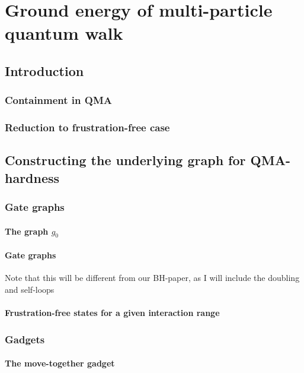 \documentclass[../thesis-main/thesis-main]{subfiles}
\begin{document}
\chapter{Ground energy of multi-particle quantum walk}

\section{Introduction}
\subsection{Containment in QMA}
\subsection{Reduction to frustration-free case}


\section{Constructing the underlying graph for QMA-hardness}

\subsection{Gate graphs}
\subsubsection{The graph $g_0$}

\subsubsection{Gate graphs}

Note that this will be different from our BH-paper, as I will include the doubling and self-loops

\subsubsection{Frustration-free states for a given interaction range}

\subsection{Gadgets}

\subsubsection{The move-together gadget}
\end{document}
